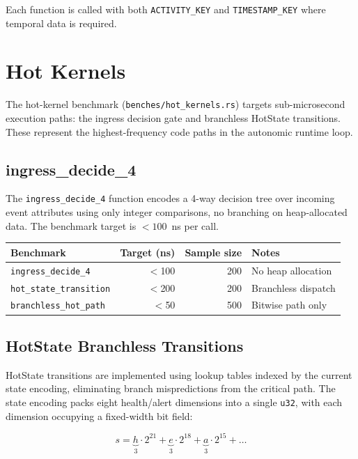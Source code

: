 \documentclass[11pt,a4paper]{article}
\begin{document}
Each function is called with both \texttt{ACTIVITY\_KEY} and
\texttt{TIMESTAMP\_KEY} where temporal data is required.

\section{Hot Kernels}
\label{sec:hotkernels}

The hot-kernel benchmark (\texttt{benches/hot\_kernels.rs}) targets
sub-microsecond execution paths: the ingress decision gate and branchless
HotState transitions. These represent the highest-frequency code paths
in the autonomic runtime loop.

\subsection{ingress\_decide\_4}

The \texttt{ingress\_decide\_4} function encodes a 4-way decision tree over
incoming event attributes using only integer comparisons, no branching on
heap-allocated data. The benchmark target is $<100$~ns per call.

\begin{center}
\begin{tabular}{@{}lrrl@{}}
\toprule
\textbf{Benchmark} & \textbf{Target (ns)} & \textbf{Sample size} &
\textbf{Notes} \\
\midrule
\texttt{ingress\_decide\_4}  & $<$100  & 200 & No heap allocation \\
\texttt{hot\_state\_transition} & $<$200 & 200 & Branchless dispatch \\
\texttt{branchless\_hot\_path}  & $<$50  & 500 & Bitwise path only \\
\bottomrule
\end{tabular}
\end{center}

\subsection{HotState Branchless Transitions}

HotState transitions are implemented using lookup tables indexed by
the current state encoding, eliminating branch mispredictions from
the critical path. The state encoding packs eight health/alert
dimensions into a single \texttt{u32}, with each dimension occupying
a fixed-width bit field:

\[
  s = \underbrace{h}_3 \cdot 2^{21} + \underbrace{e}_3 \cdot 2^{18}
    + \underbrace{a}_3 \cdot 2^{15} + \ldots
\]
\end{document}

